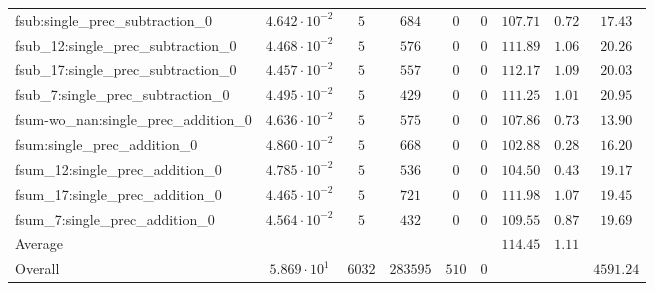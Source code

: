 \begin{tabular}{|l|c|c|c|c|c|c|c|c|}
fsub:single\_prec\_subtraction\_0              & $ 4.642 \cdot 10^{-2} $ & $ 5      $ & $ 684    $ & $ 0   $ & $ 0   $ & $ 107.71      $ & $ 0.72    $ & $ 17.43   $ \\
fsub\_12:single\_prec\_subtraction\_0          & $ 4.468 \cdot 10^{-2} $ & $ 5      $ & $ 576    $ & $ 0   $ & $ 0   $ & $ 111.89      $ & $ 1.06    $ & $ 20.26   $ \\
fsub\_17:single\_prec\_subtraction\_0          & $ 4.457 \cdot 10^{-2} $ & $ 5      $ & $ 557    $ & $ 0   $ & $ 0   $ & $ 112.17      $ & $ 1.09    $ & $ 20.03   $ \\
fsub\_7:single\_prec\_subtraction\_0           & $ 4.495 \cdot 10^{-2} $ & $ 5      $ & $ 429    $ & $ 0   $ & $ 0   $ & $ 111.25      $ & $ 1.01    $ & $ 20.95   $ \\
fsum-wo\_nan:single\_prec\_addition\_0         & $ 4.636 \cdot 10^{-2} $ & $ 5      $ & $ 575    $ & $ 0   $ & $ 0   $ & $ 107.86      $ & $ 0.73    $ & $ 13.90   $ \\
fsum:single\_prec\_addition\_0                 & $ 4.860 \cdot 10^{-2} $ & $ 5      $ & $ 668    $ & $ 0   $ & $ 0   $ & $ 102.88      $ & $ 0.28    $ & $ 16.20   $ \\
fsum\_12:single\_prec\_addition\_0             & $ 4.785 \cdot 10^{-2} $ & $ 5      $ & $ 536    $ & $ 0   $ & $ 0   $ & $ 104.50      $ & $ 0.43    $ & $ 19.17   $ \\
fsum\_17:single\_prec\_addition\_0             & $ 4.465 \cdot 10^{-2} $ & $ 5      $ & $ 721    $ & $ 0   $ & $ 0   $ & $ 111.98      $ & $ 1.07    $ & $ 19.45   $ \\
fsum\_7:single\_prec\_addition\_0              & $ 4.564 \cdot 10^{-2} $ & $ 5      $ & $ 432    $ & $ 0   $ & $ 0   $ & $ 109.55      $ & $ 0.87    $ & $ 19.69   $ \\
\hline
Average                                        & $                     $ & $        $ & $        $ & $     $ & $     $ & $ 114.45      $ & $ 1.11    $ & $         $ \\
\hline
Overall                                        & $ 5.869 \cdot 10^{1}  $ & $ 6032   $ & $ 283595 $ & $ 510 $ & $ 0   $ & $             $ & $         $ & $ 4591.24 $ \\
\hline
\end{tabular}
